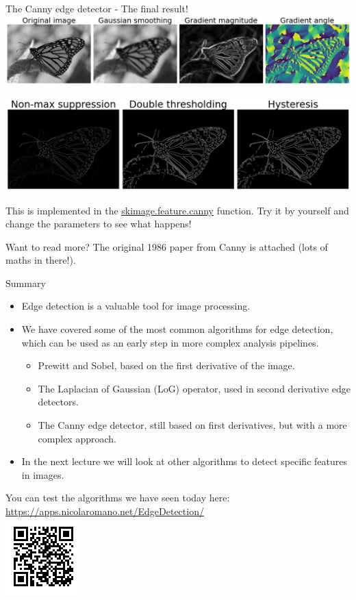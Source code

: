 \documentclass[9pt, aspectratio=169]{beamer}
\begin{document}
\begin{frame}
    {The Canny edge detector - The final result!}
    \centering
    \includegraphics[width=\textwidth]{canny_step1-2.png}

    \includegraphics[width=.75\textwidth]{canny_step3-5.png}

    This is implemented in the \href{https://scikit-image.org/docs/dev/api/skimage.feature.html\#skimage.feature.canny}{\underline{skimage.feature.canny}} function.
    Try it by yourself and change the parameters to see what happens!

    Want to read more? The original 1986 paper from Canny is attached (lots of maths in there!).
\end{frame}

\begin{frame}
    {Summary}
    \begin{itemize}
        \item Edge detection is a valuable tool for image processing.
        \item We have covered some of the most common algorithms for edge detection, which can be used as an early step in more complex analysis pipelines.
              \begin{itemize}
                  \item Prewitt and Sobel, based on the first derivative of the image.
                  \item The Laplacian of Gaussian (LoG) operator, used in second derivative edge detectors.
                  \item The Canny edge detector, still based on first derivatives, but with a more complex approach.
              \end{itemize}
        \item In the next lecture we will look at other algorithms to detect specific features in images.
    \end{itemize}

    \centering
    You can test the algorithms we have seen today here: \url{https://apps.nicolaromano.net/EdgeDetection/}\\

    \includegraphics[width=.2\textwidth]{QR_code_app.png}
\end{frame}
\end{document}
